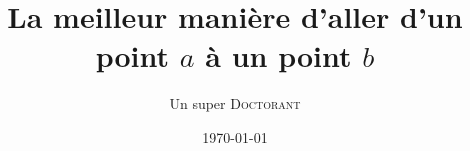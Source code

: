 \documentclass[a4paper, french, 11pt, draft, twoside,openright]{report}
\author{Un super \textsc{Doctorant}}
\title{La meilleur manière d'aller d'un point $a$ à un point $b$}
\date{\today}
\begin{document}
	\pagedegarde
	\cleardoublepage
			\setcounter{tocdepth}{2}	%
			\dominitoc						%
			\tableofcontents
			\renewcommand*\listfigurename{Liste des figures}
			\listoffigures
		\listoftables

	\setcounter{mtc}{3}	%
	
	
	
	
	
	\begin{appendix}
                
	\end{appendix}

      
      
	
\end{document}
